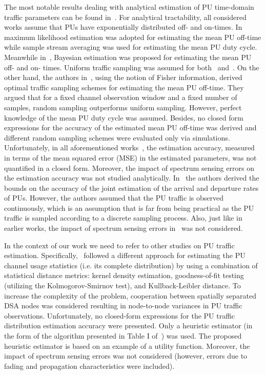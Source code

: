 \documentclass[11pt,draftclsnofoot,journal,onecolumn]{IEEEtran}
\begin{document}
The most notable results dealing with analytical estimation of PU time-domain traffic parameters can be found in~\cite{kim_tmc_2008,kim_dyspan_2008,liang_ita_2010,liang_tmc_2011}. For analytical tractability, all considered works assume that PUs have exponentially distributed off- and on-times. In~\cite{kim_tmc_2008} maximum likelihood estimation was adopted for estimating the mean PU off-time while sample stream averaging was used for estimating the mean PU duty cycle. Meanwhile in~\cite{kim_dyspan_2008}, Bayesian estimation was proposed for estimating the mean PU off- and on- times. Uniform traffic sampling was assumed for both~\cite{kim_tmc_2008} and~\cite{kim_dyspan_2008}. On the other hand, the authors in~\cite{liang_ita_2010,liang_tmc_2011}, using the notion of Fisher information, derived optimal traffic sampling schemes for estimating the mean PU off-time. They argued that for a fixed channel observation window and a fixed number of samples, random sampling outperforms uniform sampling. However, perfect knowledge of the mean PU duty cycle was assumed. Besides, no closed form expressions for the accuracy of the estimated mean PU off-time was derived and different random sampling schemes were evaluated only via simulations. Unfortunately, in all aforementioned works~\cite{kim_tmc_2008,kim_dyspan_2008,liang_ita_2010,liang_tmc_2011}, the estimation accuracy, measured in terms of the mean squared error (MSE) in the estimated parameters, was not quantified in a closed form. Moreover, the impact of spectrum sensing errors on the estimation accuracy was not studied analytically. In~\cite{tehrani_tsp_2012} the authors derived the bounds on the accuracy of the joint estimation of the arrival and departure rates of PUs. However, the authors assumed that the PU traffic is observed continuously, which is an assumption that is far from being practical as the PU traffic is sampled according to a discrete sampling process.  Also, just like in earlier works, the impact of spectrum sensing errors in~\cite{tehrani_tsp_2012} was not considered.

In the context of our work we need to refer to other studies on PU traffic estimation. Specifically,~\cite{saad_arxiv_2012} followed a different approach for estimating the PU channel usage statistics (i.e. its complete distribution) by using a combination of statistical distance metrics: kernel density estimation, goodness-of-fit testing (utilizing the Kolmogorov-Smirnov test), and Kullback-Leibler distance. To increase the complexity of the problem, cooperation between spatially separated DSA nodes was considered resulting in node-to-node variances in PU traffic observations. Unfortunately, no closed-form expressions for the PU traffic distribution estimation accuracy were presented. Only a heuristic estimator (in the form of the algorithm presented in Table I of~\cite{saad_arxiv_2012}) was used. The proposed heuristic estimator is based on an example of a utility function. Moreover, the impact of spectrum sensing errors was not considered (however, errors due to fading and propagation characteristics were included).
\end{document}
